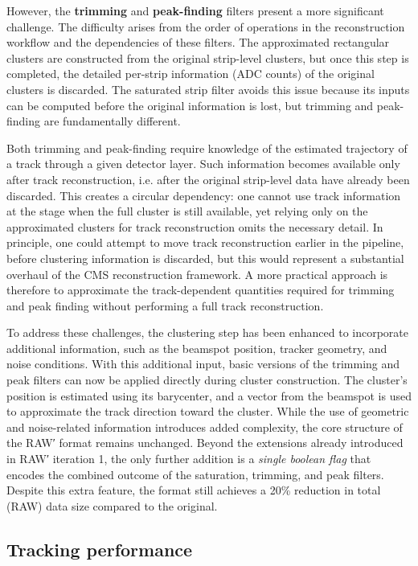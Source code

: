 However, the \textbf{trimming} and \textbf{peak-finding} filters present a more significant challenge. The difficulty arises from the order of operations in the reconstruction workflow and the dependencies of these filters. The approximated rectangular clusters are constructed from the original strip-level clusters, but once this step is completed, the detailed per-strip information (ADC counts) of the original clusters is discarded. The saturated strip filter avoids this issue because its inputs can be computed before the original information is lost, but trimming and peak-finding are fundamentally different.

Both trimming and peak-finding require knowledge of the estimated trajectory of a track through a given detector layer. Such information becomes available only after track reconstruction, i.e. after the original strip-level data have already been discarded. This creates a circular dependency: one cannot use track information at the stage when the full cluster is still available, yet relying only on the approximated clusters for track reconstruction omits the necessary detail. In principle, one could attempt to move track reconstruction earlier in the pipeline, before clustering information is discarded, but this would represent a substantial overhaul of the CMS reconstruction framework. A more practical approach is therefore to approximate the track-dependent quantities required for trimming and peak finding without performing a full track reconstruction.

To address these challenges, the clustering step has been enhanced to incorporate additional information, such as the beamspot position, tracker geometry, and noise conditions. With this additional input, basic versions of the trimming and peak filters can now be applied directly during cluster construction. The cluster’s position is estimated using its barycenter, and a vector from the beamspot is used to approximate the track direction toward the cluster. While the use of geometric and noise-related information introduces added complexity, the core structure of the RAW′ format remains unchanged. Beyond the extensions already introduced in RAW′ iteration 1, the only further addition is a \textit{single boolean flag} that encodes the combined outcome of the saturation, trimming, and peak filters. Despite this extra feature, the format still achieves a 20\% reduction in total (RAW) data size compared to the original.

\subsection{Tracking performance}

